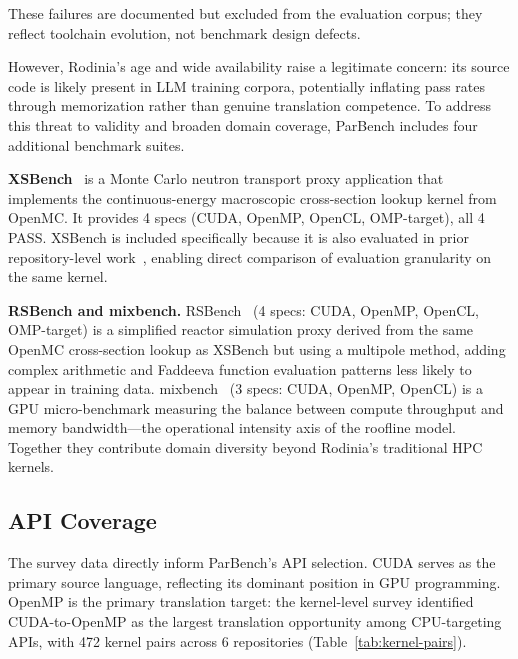 \documentclass[conference]{IEEEtran}
\begin{document}
These failures are documented but excluded from the evaluation corpus; they reflect toolchain evolution, not benchmark design defects.

However, Rodinia's age and wide availability raise a legitimate concern: its source code is likely present in LLM training corpora, potentially inflating pass rates through memorization rather than genuine translation competence. To address this threat to validity and broaden domain coverage, ParBench includes four additional benchmark suites.

\textbf{XSBench}~\cite{XSBench2014} is a Monte Carlo neutron transport proxy application that implements the continuous-energy macroscopic cross-section lookup kernel from OpenMC. It provides 4 specs (CUDA, OpenMP, OpenCL, OMP-target), all 4 PASS. XSBench is included specifically because it is also evaluated in prior repository-level work~\cite{ParEvalRepo2025}, enabling direct comparison of evaluation granularity on the same kernel.

\textbf{RSBench and mixbench.} RSBench~\cite{RSBench2014} (4 specs: CUDA, OpenMP, OpenCL, OMP-target) is a simplified reactor simulation proxy derived from the same OpenMC cross-section lookup as XSBench but using a multipole method, adding complex arithmetic and Faddeeva function evaluation patterns less likely to appear in training data. mixbench~\cite{mixbench2017} (3 specs: CUDA, OpenMP, OpenCL) is a GPU micro-benchmark measuring the balance between compute throughput and memory bandwidth---the operational intensity axis of the roofline model. Together they contribute domain diversity beyond Rodinia's traditional HPC kernels.

\subsection{API Coverage}
\label{sec:api-coverage}

The survey data directly inform ParBench's API selection. CUDA serves as the primary source language, reflecting its dominant position in GPU programming. OpenMP is the primary translation target: the kernel-level survey identified CUDA-to-OpenMP as the largest translation opportunity among CPU-targeting APIs, with 472 kernel pairs across 6 repositories (Table~\ref{tab:kernel-pairs}).
\end{document}
